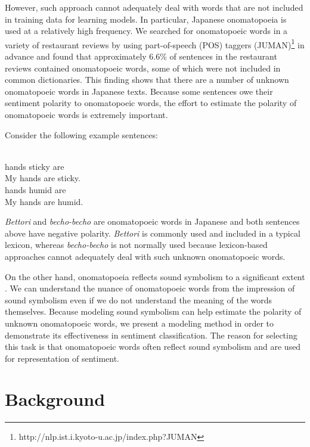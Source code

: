 \documentclass[english]{jnlp_1.4}
\begin{document}
However, such approach cannot adequately deal with words that are not included in training data for learning models.
In particular, Japanese onomatopoeia is used at a relatively high frequency.
We searched for onomatopoeic words in a variety of restaurant reviews by using part-of-speech (POS) taggers (JUMAN)\footnote{http://nlp.ist.i.kyoto-u.ac.jp/index.php?JUMAN} in advance 
and found that approximately 6.6\% of sentences in the restaurant reviews contained onomatopoeic words,
some of which were not included in common dictionaries.
This finding shows that there are a number of unknown onomatopoeic words in Japanese texts.
Because some sentences owe their sentiment polarity to onomatopoeic words,
the effort to estimate the polarity of onomatopoeic words is extremely important.

Consider the following example sentences:
\begin{exe}
	\\
	{\footnotesize hands\hspace{3mm} sticky\hspace{4mm} are}\\My hands are sticky.
	\label{ex:bettori}
	\\
	{\footnotesize hands\hspace{7mm} humid\hspace{8mm} are}\\My hands are humid.
	\label{ex:gucchori}
\end{exe}
{\it Bettori} and {\it becho-becho} are onomatopoeic words in Japanese and
both sentences above have negative polarity.
{\it Bettori} is commonly used and included in a typical lexicon, whereas {\it becho-becho} is not normally used because
lexicon-based approaches cannot adequately deal with such unknown onomatopoeic words.

On the other hand, onomatopoeia reflects sound symbolism to a significant extent \cite{hamano1998}.
We can understand the nuance of onomatopoeic words from the impression of sound symbolism even if we do not understand the meaning of the words themselves.
Because modeling sound symbolism can help estimate the polarity of unknown onomatopoeic words,
we present a modeling method in order to demonstrate its effectiveness in sentiment classification. 
The reason for selecting this task is that onomatopoeic words often reflect sound symbolism and are used for representation of sentiment.


\section{Background}
\end{document}

